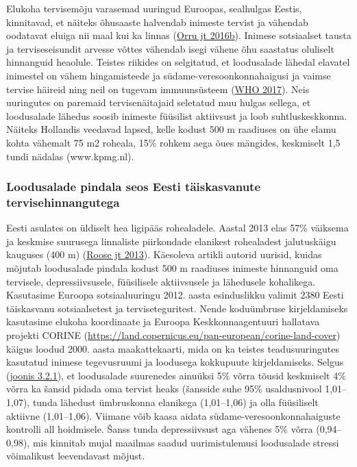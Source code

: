 \documentclass[estonian,]{article}
\begin{document}
Elukoha tervisemõju varasemad uuringud Euroopas, sealhulgas Eestis, kinnitavad, et näiteks õhusaaste halvendab inimeste tervist ja vähendab oodatavat eluiga nii maal kui ka linnas (\protect\hyperlink{Orru2016}{Orru jt 2016b}). Inimese sotsiaalset tausta ja terviseseisundit arvesse võttes vähendab isegi vähene õhu saastatus oluliselt hinnanguid heaolule. Teistes riikides on selgitatud, et loodusalade lähedal elavatel inimestel on vähem hingamisteede ja südame-veresoonkonnahaigusi ja vaimse tervise häireid ning neil on tugevam immuunsüsteem (\protect\hyperlink{WHO2017}{WHO 2017}). Neis uuringutes on paremaid tervisenäitajaid seletatud muu hulgas sellega, et loodusalade lähedus soosib inimeste füüsilist aktiivsust ja loob suhtluskeskkonna. Näiteks Hollandis veedavad lapsed, kelle kodust 500 m raadiuses on ühe elamu kohta vähemalt 75 m2 roheala, 15\% rohkem aega õues mängides, keskmiselt 1,5 tundi nädalas (www.kpmg.nl).

\hypertarget{loodusalade-pindala-seos-eesti-tuxe4iskasvanute-tervisehinnangutega}{%
\subsubsection*{Loodusalade pindala seos Eesti täiskasvanute tervisehinnangutega}\label{loodusalade-pindala-seos-eesti-tuxe4iskasvanute-tervisehinnangutega}}

Eesti asulates on üldiselt hea ligipääs rohealadele. Aastal 2013 elas 57\% väiksema ja keskmise suurusega linnaliste piirkondade elanikest rohealadest jalutuskäigu kauguses (400 m) (\protect\hyperlink{Roose2013}{Roose jt 2013}). Käesoleva artikli autorid uurisid, kuidas mõjutab loodusalade pindala kodust 500 m raadiuses inimeste hinnanguid oma tervisele, depressiivsusele, füüsilisele aktiivsusele ja lähedusele kohalikega. Kasutasime Euroopa sotsiaaluuringu 2012. aasta esinduslikku valimit 2380 Eesti täiskasvanu sotsiaalsetest ja terviseteguritest. Nende koduümbruse kirjeldamiseks kasutasime elukoha koordinaate ja Euroopa Keskkonnaagentuuri hallatava projekti CORINE (\url{https://land.copernicus.eu/pan-european/corine-land-cover}) käigus loodud 2000. aasta maakattekaarti, mida on ka teistes teadusuuringutes kasutatud inimese tegevusruumi ja loodusega kokkupuute kirjeldamiseks. Selgus (\protect\hyperlink{figure321}{joonis 3.2.1}), et loodusalade suurenedes ainuüksi 5\% võrra tõusid keskmiselt 4\% võrra ka šansid pidada oma tervist heaks (šansside suhe 95\% usaldusnivool 1,01--1,07), tunda lähedust ümbruskonna elanikega (1,01--1,06) ja olla füüsiliselt aktiivne (1,01--1,06). Viimane võib kaasa aidata südame-veresoonkonnahaiguste kontrolli all hoidmisele. Šanss tunda depressiivsust aga vähenes 5\% võrra (0,94--0,98), mis kinnitab mujal maailmas saadud uurimistulemusi loodusalade stressi võimalikust leevendavast mõjust.
\end{document}
